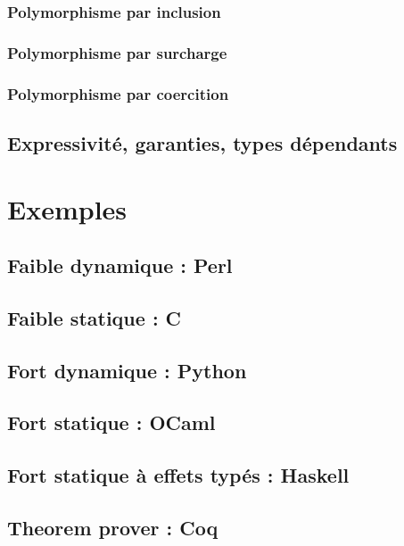 \subsubsection{Polymorphisme par inclusion}

\subsubsection{Polymorphisme par surcharge}

\subsubsection{Polymorphisme par coercition}


\subsection{Expressivité, garanties, types dépendants}

\section{Exemples}

\subsection{Faible dynamique : Perl}
\subsection{Faible statique : C}
\subsection{Fort dynamique : Python}
\subsection{Fort statique : OCaml}
\subsection{Fort statique à effets typés : Haskell}
\subsection{Theorem prover : Coq}

